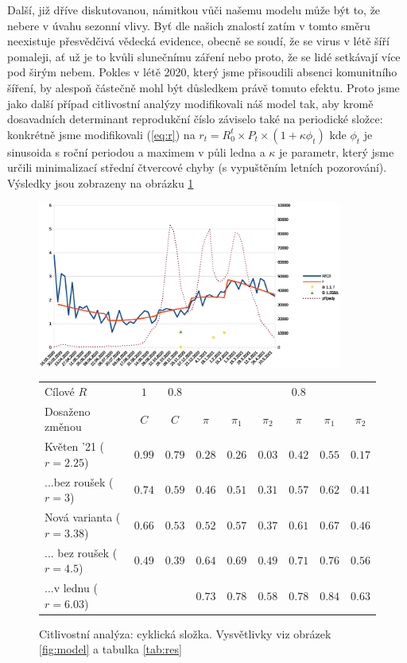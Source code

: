 Další, již dříve diskutovanou, námitkou vůči našemu modelu může být to, že nebere v úvahu sezonní
vlivy. Byť dle našich znalostí zatím v tomto směru neexistuje přesvědčivá vědecká
evidence, obecně se soudí, že se virus v létě šíří pomaleji, ať už
je to kvůli slunečnímu záření nebo proto, že se lidé setkávají více
pod širým nebem. Pokles v létě 2020, který jsme přisoudili absenci
komunitního šíření, by alespoň částečně mohl být důsledkem právě tomuto
efektu. Proto jsme jako další případ citlivostní analýzy modifikovali
náš model tak, aby kromě dosavadních determinant reprodukční číslo záviselo
také na periodické složce: konkrétně jsme modifikovali (\ref{eq:r}) na 
$r_{t}=R_{0}^{t}\times P_{t}\times(1+\kappa\phi_{t})$ kde $\phi_{t}$
je sinusoida s roční periodou a maximem v půli ledna a $\kappa$ je
parametr, který jsme určili minimalizací střední čtvercové chyby (s
vypuštěním letních pozorování). Výsledky jsou zobrazeny na obrázku \ref{fig:cc}

\begin{figure}

\begin{center}

\includegraphics[width=10cm]{pic/wholec} 

\begin{tabular}{l|c|c|ccc|ccc}									
Cílové $R$	& $1$	& $0.8$	&	&	&	& $0.8$	&	&	\\ 
Dosaženo změnou	& $C$	& $C$	& $\pi$	& $\pi_1$	& $\pi_2$	& $\pi$	& $\pi_1$	& $\pi_2$	\\ \hline
Květen '21 ($r=2.25$)	& $0.99$	& $0.79$	& $0.28$	& $0.26$	& $0.03$	& $0.42$	& $0.55$	& $0.17$	\\
...bez roušek ($r=3$)	& $0.74$	& $0.59$	& $0.46$	& $0.51$	& $0.31$	& $0.57$	& $0.62$	& $0.41$	\\
Nová varianta ($r=3.38$)	& $0.66$	& $0.53$	& $0.52$	& $0.57$	& $0.37$	& $0.61$	& $0.67$	& $0.46$	\\
... bez roušek ($r=4.5$)	& $0.49$	& $0.39$	& $0.64$	& $0.69$	& $0.49$	& $0.71$	& $0.76$	& $0.56$	\\
...v lednu ($r=6.03$)	&	&	& $0.73$	& $0.78$	& $0.58$	& $0.78$	& $0.84$	& $0.63$	\\
\end{tabular}									


\caption{Citlivostní analýza: cyklická složka. Vysvětlivky viz obrázek \ref{fig:model} a tabulka \ref{tab:res}}
\label{fig:cc}
\end{center}

\end{figure}


